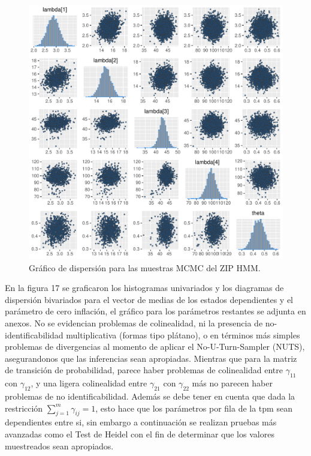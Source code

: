 \documentclass[a4paper]{article}\usepackage[]{graphicx}\usepackage[]{color}
\makeatletter
\def\maxwidth{ %
  \ifdim\Gin@nat@width>\linewidth
    \linewidth
  \else
    \Gin@nat@width
  \fi
}
\newenvironment{knitrout}{}{} %
\makeatother
\begin{document}
\begin{knitrout}
\color{fgcolor}\begin{figure}
\includegraphics[width=\maxwidth]{figure/unnamed-chunk-52-1} \caption[Gráfico de dispersión para las muestras MCMC del ZIP HMM]{Gráfico de dispersión para las muestras MCMC del ZIP HMM.}\label{fig:unnamed-chunk-52}
\end{figure}


\end{knitrout}

En la figura 17 se graficaron los histogramas univariados y los diagramas de dispersión bivariados para el vector de medias de los estados dependientes y el parámetro de cero inflación, el gráfico para los parámetros restantes se adjunta en anexos. No se evidencian problemas de colinealidad, ni la presencia de no-identificabilidad multiplicativa (formas tipo plátano), o en términos más simples problemas de divergencias al momento de aplicar el No-U-Turn-Sampler (NUTS), asegurandonos que las inferencias sean apropiadas. Mientras que para la matriz de transición de probabilidad, parece haber problemas de colinealidad entre $\gamma_{11}$ con $\gamma_{12}$, y una ligera colinealidad entre $\gamma_{21}$ con $\gamma_{22}$ más no parecen haber problemas de no identificabilidad. Además se debe tener en cuenta que dada la restricción $\sum_{j=1}^m \gamma_{ij} = 1$, esto hace que los parámetros por fila de la tpm sean dependientes entre si, sin embargo a continuación se realizan pruebas más avanzadas como el Test de Heidel con el fin de determinar que los valores muestreados sean apropiados.
\end{document}
